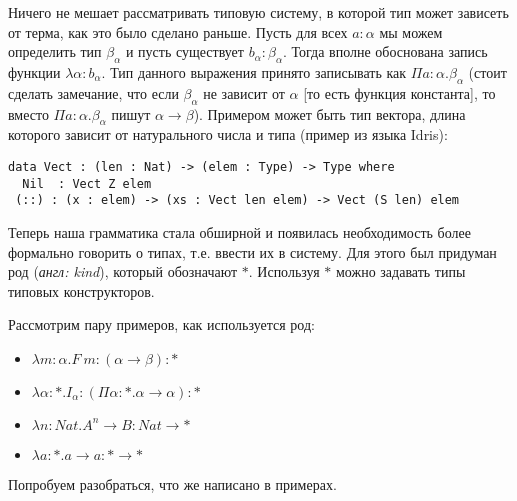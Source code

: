 Ничего не мешает рассматривать типовую систему, в которой тип может зависеть от терма, как это было сделано раньше. Пусть для всех $a : \alpha$ мы можем определить тип $\beta_\alpha$ и пусть существует $b_\alpha : \beta_\alpha$. Тогда вполне обоснована запись функции $\lambda \alpha : b_\alpha$. Тип данного выражения принято записывать как $\Pi a :\alpha . \beta_\alpha$ (стоит сделать замечание, что если $\beta_\alpha$ не зависит от $\alpha$ [то есть функция константа], то вместо $\Pi a :\alpha . \beta_\alpha$ пишут $\alpha \rightarrow \beta$). Примером может быть тип вектора, длина которого зависит от натурального числа и типа (пример из языка Idris):
\begin{verbatim}
data Vect : (len : Nat) -> (elem : Type) -> Type where
  Nil  : Vect Z elem
 (::) : (x : elem) -> (xs : Vect len elem) -> Vect (S len) elem
\end{verbatim}

Теперь наша грамматика стала обширной и появилась необходимость более формально говорить о типах, т.е. ввести их в систему. Для этого был придуман род (\textit{англ: kind}), который обозначают $*$. Используя $*$ можно задавать типы типовых конструкторов.

Рассмотрим пару примеров, как используется род:

\begin{itemize}
    \item $\lambda m : \alpha.F\ m : (\alpha \rightarrow \beta) : *$
    \item $\lambda \alpha : *.I_\alpha : (\Pi \alpha : * . \alpha \rightarrow \alpha):*$
    \item $\lambda n : Nat . A^n \rightarrow B : Nat \rightarrow *$
    \item $\lambda a : *. a \rightarrow a : * \rightarrow *$
\end{itemize}

Попробуем разобраться, что же написано в примерах.

